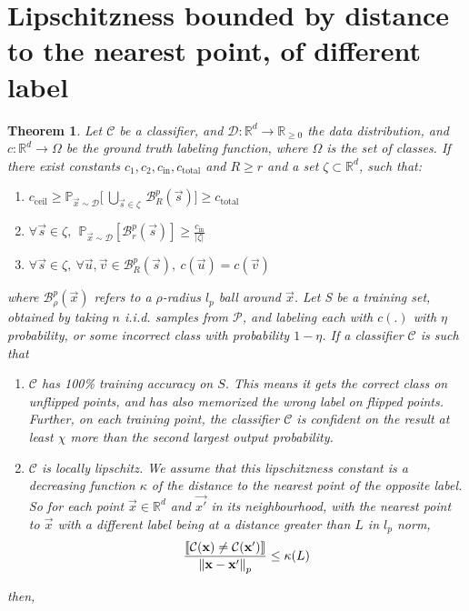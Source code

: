 \documentclass{ociamthesis}
\newtheorem{theorem}{Theorem}
\begin{document}
\section{Lipschitzness bounded by distance to the nearest point, of different label}
\begin{theorem}
    \label{theorem:lipschitzness-extension-closest-one}
    Let $\mathcal{C}$ be a classifier, and $\mathcal{D}: \mathbb{R}^d \to
    \mathbb{R}_{\geq 0}$ the data distribution, and $c: \mathbb{R}^d \to \Omega$
    be the ground truth labeling function, where $\Omega$ is the set of classes.
    If there exist constants $c_1, c_2, c_{\text{in}}, c_{\text{total}}$ and $R
    \geq r$ and a set $\zeta \subset \mathbb{R}^d$, such that:
    \begin{enumerate}
        \item $c_{\text{ceil}} \geq \mathbb{P}_{\vec{x} \sim \mathcal{D}} \bigg
        [~\underset{\vec{s} \in \zeta}{\bigcup}~\mathcal{B}_R^p(\vec{s}) \bigg ]
        \geq c_{\text{total}}$
        \item $\forall \vec{s} \in \zeta,~~ \mathbb{P}_{\vec{x} \sim
        \mathcal{D}} [\mathcal{B}_r^p(\vec{s})] \geq
        \frac{c_{\text{in}}}{|\zeta|}$
        \item $\forall \vec{s} \in \zeta,~\forall \vec{u}, \vec{v} \in
        \mathcal{B}_R^p(\vec{s}),~c(\vec{u}) = c(\vec{v})$
    \end{enumerate}
    where $\mathcal{B}^p_\rho(\vec{x})$ refers to a $\rho$-radius $l_p$ ball
    around $\vec{x}$. Let S be a training set, obtained by taking $n$ i.i.d.
    samples from $\mathcal{P}$, and labeling each with $c(.)$ with $\eta$
    probability, or some incorrect class with probability $1-\eta$. If a
    classifier $\mathcal{C}$ is such that
    \begin{enumerate}
        \item $\mathcal{C}$ has 100\% training accuracy on $S$. This means it
        gets the correct class on unflipped points, and has also memorized the
        wrong label on flipped points. Further, on each training point, the
        classifier $\mathcal{C}$ is confident on the result at least $\chi$ more
        than the second largest output probability.
        \item $\mathcal{C}$ is locally lipschitz. We assume that this
        lipschitzness constant is a decreasing function $\kappa$ of the distance
        to the nearest point of the opposite label. So for each point $\vec{x}
        \in \mathbb{R}^d$ and $\vec{x'}$ in its neighbourhood, with the nearest
        point to $\vec{x}$ with a different label being at a distance greater
        than $L$ in $l_p$ norm,
            \begin{equation*}
                \frac{\llbracket \mathcal{C}({\mathbf{x}}) \neq \mathcal{C}({\mathbf{x'}}) \rrbracket}
                    {\mathrm{\left\lVert{\mathbf{x}} - {\mathbf{x'}}\right\rVert}_p} 
                \leq \kappa(L)
            \end{equation*}
    \end{enumerate}
    then,


\end{theorem}
\end{document}
